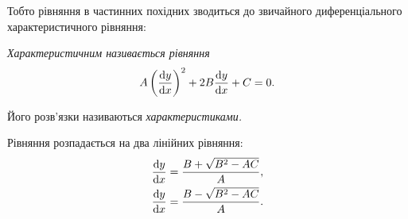 Тобто рівняння в частинних похідних зводиться до звичайного диференціального характеристичного рівняння:
\begin{definition}
	\it{Характеристичним} називається рівняння
	\begin{equation}
		A \left( \dfrac{\mathop{}\!\mathrm{d} y}{\mathop{}\!\mathrm{d} x} \right)^2 + 2 B \dfrac{\mathop{}\!\mathrm{d} y}{\mathop{}\!\mathrm{d} x} + C = 0.
	\end{equation}
\end{definition}

\begin{definition}[характеристик]
	Його розв'язки називаються \it{характеристиками}.
\end{definition}

Рівняння розпадається на два лінійних рівняння:
\begin{align}
	\dfrac{\mathop{}\!\mathrm{d} y}{\mathop{}\!\mathrm{d} x} &= \dfrac{B + \sqrt{B^2 - AC}}{A}, \\ 
	\dfrac{\mathop{}\!\mathrm{d} y}{\mathop{}\!\mathrm{d} x} &= \dfrac{B - \sqrt{B^2 - AC}}{A}.
\end{align}

